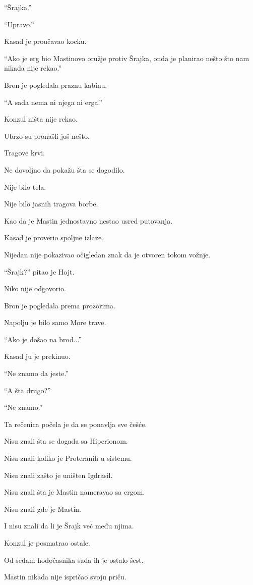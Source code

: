 ``Šrajka.''

``Upravo.''

Kasad je proučavao kocku.

``Ako je erg bio Mastinovo oružje protiv Šrajka, onda je planirao nešto što nam nikada nije rekao.''

Bron je pogledala praznu kabinu.

``A sada nema ni njega ni erga.''

Konzul ništa nije rekao.

\bigskip

Ubrzo su pronašli još nešto.

Tragove krvi.

Ne dovoljno da pokažu šta se dogodilo.

Nije bilo tela.

Nije bilo jasnih tragova borbe.

Kao da je Mastin jednostavno nestao usred putovanja.

Kasad je proverio spoljne izlaze.

Nijedan nije pokazivao očigledan znak da je otvoren tokom vožnje.

``Šrajk?'' pitao je Hojt.

Niko nije odgovorio.

Bron je pogledala prema prozorima.

Napolju je bilo samo More trave.

``Ako je došao na brod...''

Kasad ju je prekinuo.

``Ne znamo da jeste.''

``A šta drugo?''

``Ne znamo.''

Ta rečenica počela je da se ponavlja sve češće.

Nisu znali šta se događa sa Hiperionom.

Nisu znali koliko je Proteranih u sistemu.

Nisu znali zašto je uništen Igdrasil.

Nisu znali šta je Mastin nameravao sa ergom.

Nisu znali gde je Mastin.

I nisu znali da li je Šrajk već među njima.

\bigskip

Konzul je posmatrao ostale.

Od sedam hodočasnika sada ih je ostalo šest.

Mastin nikada nije ispričao svoju priču.

